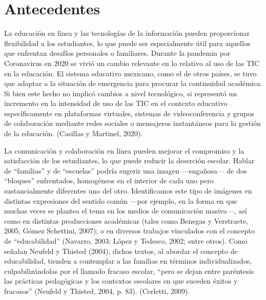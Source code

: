 \section{Antecedentes}

\hspace{2cm}La educación en línea y las tecnologías de la información pueden proporcionar flexibilidad a los estudiantes, lo que puede ser especialmente útil para aquellos que enfrentan
desafíos personales o familiares. Durante la pandemia por Coronavirus en 2020 se vivió un cambio relevante en lo relativo
al uso de las TIC en la educación. El sistema educativo mexicano, como el de otros países, se
tuvo que adaptar a la situación de emergencia para procurar la continuidad académica. Si bien
este hecho no implicó cambios a nivel tecnológico, si representó un incremento en la intensidad
de uso de las TIC en el contexto educativo específicamente en plataformas virtuales, sistemas de
videoconferencia y grupos de colaboración mediante redes sociales o mensajeros instantáneos
para la gestión de la educación. (Casillas y Martinel, 2020).

La comunicación y colaboración en línea pueden mejorar el compromiso y la satisfacción
de los estudiantes, lo que puede reducir la deserción escolar.
Hablar de “familias” y de “escuelas” podría sugerir una imagen —engañosa— de dos
“bloques” enfrentados, homogéneos en el interior de cada uno pero sustancialmente diferentes
uno del otro. Identificamos este tipo de imágenes en distintas expresiones del sentido común
—por ejemplo, en la forma en que muchas veces se plantea el tema en los medios de
comunicación masiva—, así como en distintas producciones académicas (tales como Benegas y
Verstraete, 2005; Gómez Schettini, 2007); o en diversos trabajos vinculados con el concepto de
“educabilidad” (Navarro, 2003; López y Tedesco, 2002; entre otros). Como señalan Neufeld y
Thisted (2004), dichos textos, al abordar el concepto de educabilidad, tienden a contemplar a las
familias en términos individualizados, culpabilizándolas por el llamado fracaso escolar, “pero se
dejan entre paréntesis las prácticas pedagógicas y los contextos escolares en que suceden éxitos y
fracasos” (Neufeld y Thisted, 2004, p. 83). (Cerletti, 2009).

